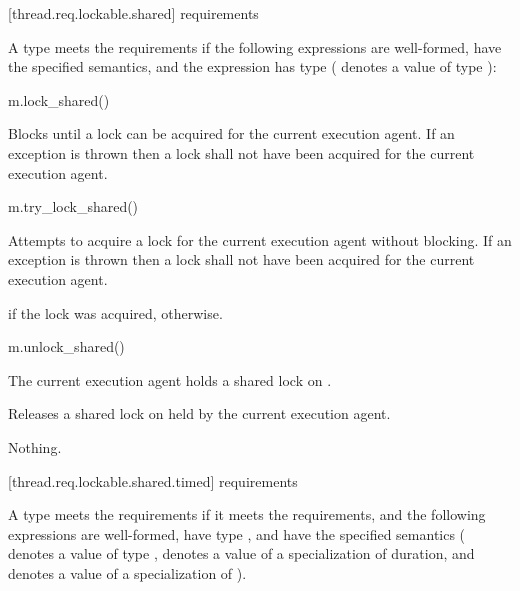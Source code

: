 [thread.req.lockable.shared]{ requirements}

\pnum
A type  meets the  requirements if
the following expressions are well-formed, have the specified semantics, and
the expression  has type 
( denotes a value of type ):

\begin{itemdecl}
m.lock_shared()
\end{itemdecl}

\begin{itemdescr}
\pnum
\effects
Blocks until a lock can be acquired for the current execution agent.
If an exception is thrown then a lock shall not have been acquired for
the current execution agent.
\end{itemdescr}

\begin{itemdecl}
m.try_lock_shared()
\end{itemdecl}

\begin{itemdescr}
\pnum
\effects
Attempts to acquire a lock for the current execution agent without blocking.
If an exception is thrown then a lock shall not have been acquired for
the current execution agent.

\pnum
\returns
{} if the lock was acquired,  otherwise.
\end{itemdescr}

\begin{itemdecl}
m.unlock_shared()
\end{itemdecl}

\begin{itemdescr}
\pnum
\expects
The current execution agent holds a shared lock on .

\pnum
\effects
Releases a shared lock on  held by the current execution agent.

\pnum
\throws
Nothing.
\end{itemdescr}

[thread.req.lockable.shared.timed]{ requirements}

\pnum
A type  meets the  requirements if
it meets the  requirements, and
the following expressions are well-formed, have type , and
have the specified semantics
( denotes a value of type ,
 denotes a value of a specialization of duration, and
 denotes a value of a specialization of ).

